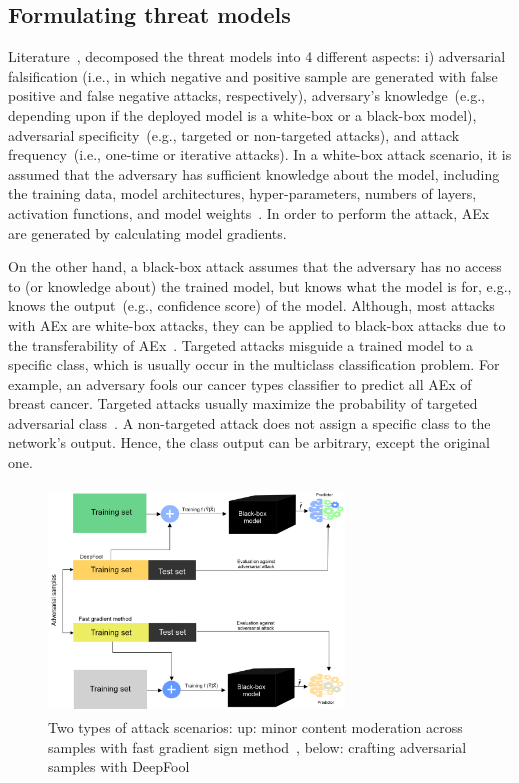\subsection{Formulating threat models}
Literature~\cite{yuan2019adversarial}, decomposed the threat models into 4 different aspects: i) adversarial falsification (i.e., in which negative and positive sample are generated with false positive and false negative attacks, respectively), adversary's knowledge~(e.g., depending upon if the deployed model is a white-box or a black-box model), adversarial specificity~(e.g., targeted or non-targeted attacks), and attack frequency~(i.e., one-time or iterative attacks). In a white-box attack scenario, it is assumed that the adversary has sufficient knowledge about the model, including the training data, model architectures, hyper-parameters, numbers of layers, activation functions, and model weights~\cite{yuan2019adversarial}. In order to perform the attack, AEx are generated by calculating model gradients. 

\hspace*{3.5mm} On the other hand, a black-box attack assumes that the adversary has no access to (or knowledge about) the trained model, but knows what the model is for, e.g., knows the output~(e.g., confidence score) of the model. Although, most attacks with AEx are white-box attacks, they can be applied to black-box attacks due to the transferability of AEx~\cite{papernot2016transferability}. Targeted attacks misguide a trained model to a specific class, which is usually occur in the multiclass classification problem. For example, an adversary fools our cancer types classifier to predict all AEx of breast cancer. Targeted attacks usually maximize the probability of targeted adversarial class~\cite{yuan2019adversarial}. A non-targeted attack does not assign a specific class to the network's output. Hence, the class output can be arbitrary, except the original one.

\begin{figure}[htp!]
    \centering
    \includegraphics[width=0.7\textwidth,height=60mm]{images/aattacks.png}
    \caption{Two types of attack scenarios: up: minor content moderation across samples with fast gradient sign method~\cite{goodfellow2014explaining}, below: crafting adversarial samples with DeepFool}
    \label{fig:aattacks}
    \vspace{-2mm}
\end{figure}

